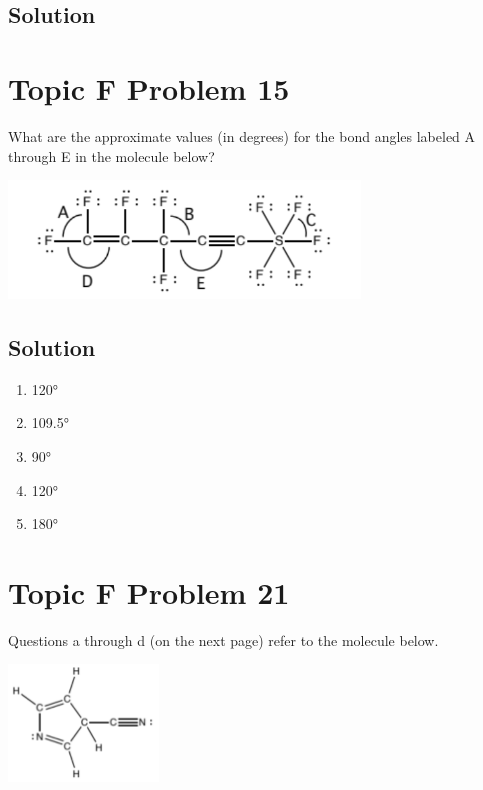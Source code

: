 \documentclass[10pt]{article}
\begin{document}
        \subsection{Solution}

    \pagebreak
    \setcounter{section}{14}
    \section{Topic F Problem 15}
        What are the approximate values (in degrees) for the bond angles labeled A through E in the molecule below?
        \begin{center}
            \includegraphics[width=0.7\textwidth]{img-F15.png}
        \end{center}
        
        \subsection{Solution}
            \begin{enumerate}[label=\Alph*:]
                \item   120\unit{\degree}
                \item   109.5\unit{\degree}
                \item   90\unit{\degree}
                \item   120\unit{\degree}
                \item   180\unit{\degree}
            \end{enumerate}

    \pagebreak
    \setcounter{section}{20}
    \section{Topic F Problem 21}
        Questions a through d (on the next page) refer to the molecule below.
        \begin{center}
            \includegraphics[width=0.3\textwidth]{img-F21.png}
        \end{center}
\end{document}
